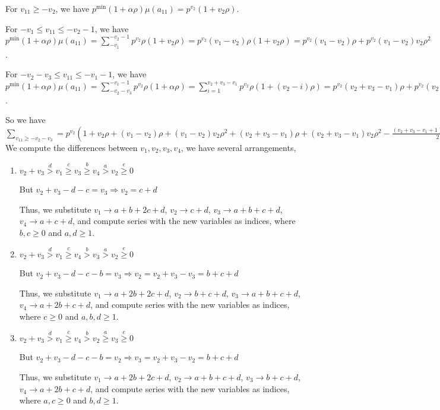 \documentclass{article}
\begin{document}
For $v_{11}\geq{-v_2}$, we have $p^{\min}(1+\alpha\rho)\mu(a_{11})=p^{v_2}(1+v_2\rho)$.

For $-v_1\leq{v_{11}}\leq{-v_2-1}$, we have $p^{\min}(1+\alpha\rho)\mu(a_{11})=\sum_{-v_1}^{-v_2-1}p^{v_2}\rho(1+v_2\rho)=p^{v_2}(v_1-v_2)\rho(1+v_2\rho)=p^{v_2}(v_1-v_2)\rho+p^{v_2}(v_1-v_2)v_2\rho^2$.

For $-v_2-v_3\leq{v_{11}}\leq{-v_1-1}$, we have $p^{\min}(1+\alpha\rho)\mu(a_{11})=\sum_{-v_2-v_3}^{-v_1-1}p^{v_2}\rho(1+\alpha\rho)=\sum_{i=1}^{v_2+v_3-v_1}p^{v_2}\rho(1+(v_2-i)\rho)=p^{v_2}(v_2+v_3-v_1)\rho+p^{v_2}(v_2+v_3-v_1)v_2\rho^2-p^{v_2}\binom{v_2+v_3-v_1+1}{2}\rho^2$.

So we have $\sum_{v_{11}\geq{-v_2-v_3}}=p^{v_2}(1+v_2\rho+(v_1-v_2)\rho+(v_1-v_2)v_2\rho^2+(v_2+v_3-v_1)\rho+(v_2+v_3-v_1)v_2\rho^2-\frac{(v_2+v_3-v_1+1)(v_2+v_3-v_1)}{2}\rho^2)=p^{v_2}(1+v_2\rho+v_3\rho-\frac{v_2^2}{2}\rho^2+\frac{v_2v_1}{2}\rho^2-\frac{v_3^2}{2}\rho^2+\frac{v_3v_1}{2}\rho^2+\frac{v_1v_2}{2}\rho^2+\frac{v_1v_3}{2}\rho^2-\frac{v_1^2}{2}\rho^2-\frac{v_2}{2}\rho^2-\frac{v_3}{2}\rho^2+\frac{v_1}{2}\rho^2)=p^{v_2}(1+v_2\rho+v_3\rho-\frac{v_2^2}{2}\rho^2+v_2v_1\rho^2-\frac{v_3^2}{2}\rho^2+v_3v_1\rho^2-\frac{v_1^2}{2}\rho^2-\frac{v_2}{2}\rho^2-\frac{v_3}{2}\rho^2+\frac{v_1}{2}\rho^2).$
We compute the differences between $v_1,v_2,v_3,v_4$, we have several arrangements,
\begin{enumerate}
    \item 
$v_2+v_3\overset{d}{>}v_1\overset{c}{\geq}v_3\overset{b}{\geq}{v_4}\overset{a}>v_2\overset{e}{\geq}{0}$

But $v_2+v_3-d-c=v_3\Rightarrow{v_2=c+d}$

Thus, we substitute 
$v_1\rightarrow{a+b+2c+d}$, 
$v_2\rightarrow{c+d}$, 
$v_3\rightarrow{a+b+c+d}$, 
$v_4\rightarrow{a+c+d}$, and compute series with the new variables as indices, where $b,c\geq{0}$ and $a,d\geq{1}$.

\item 
$v_2+v_3\overset{d}{>}v_1\overset{c}{\geq}v_4\overset{b}{>}{v_3}\overset{a}>v_2\overset{e}{\geq}{0}$

But $v_2+v_3-d-c-b=v_3\Rightarrow{v_2=v_2+v_3-v_3=b+c+d}$

Thus, we substitute 
$v_1\rightarrow{a+2b+2c+d}$, 
$v_2\rightarrow{b+c+d}$, 
$v_3\rightarrow{a+b+c+d}$, 
$v_4\rightarrow{a+2b+c+d}$, and compute series with the new variables as indices, where $c\geq{0}$ and $a,b,d\geq{1}$.

\item 
$v_2+v_3\overset{d}{>}v_1\overset{c}{\geq}v_4\overset{b}{>}{v_2}\overset{a}{\geq}v_3\overset{e}{\geq}{0}$

But $v_2+v_3-d-c-b=v_2\Rightarrow{v_3=v_2+v_3-v_2=b+c+d}$

Thus, we substitute 
$v_1\rightarrow{a+2b+2c+d}$, 
$v_2\rightarrow{a+b+c+d}$, 
$v_3\rightarrow{b+c+d}$, 
$v_4\rightarrow{a+2b+c+d}$, and compute series with the new variables as indices, where $a,c\geq{0}$ and $b,d\geq{1}$.

\end{enumerate}
\end{document}
